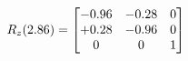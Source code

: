 \documentclass[preview]{standalone}
\begin{document}
\begin{align*}
\special{dvisvgm:raw <g id='unique000'>}R_{z}(2.86) = \begin{bmatrix}-0.96 & -0.28 & 0 \\+0.28 & -0.96 & 0 \\0 & 0 & 1\end{bmatrix}\special{dvisvgm:raw </g>}
\end{align*}
\end{document}
